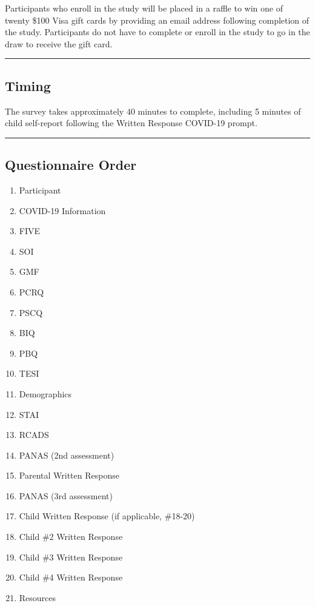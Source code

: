 \documentclass[]{book}
\providecommand{\tightlist}{%
  \setlength{\itemsep}{0pt}\setlength{\parskip}{0pt}}
\begin{document}
Participants who enroll in the study will be placed in a raffle to win one of twenty \$100 Visa gift cards by providing an email address following completion of the study. Participants do not have to complete or enroll in the study to go in the draw to receive the gift card.

\begin{center}\rule{0.5\linewidth}{0.5pt}\end{center}

\hypertarget{timing}{%
\subsection{Timing}\label{timing}}

The survey takes approximately 40 minutes to complete, including 5 minutes of child self-report following the Written Response COVID-19 prompt.

\begin{center}\rule{0.5\linewidth}{0.5pt}\end{center}

\hypertarget{questionnaire-order}{%
\subsection{Questionnaire Order}\label{questionnaire-order}}

\begin{enumerate}
\def\labelenumi{\arabic{enumi}.}
\tightlist
\item
  Participant
\item
  COVID-19 Information
\item
  FIVE
\item
  SOI
\item
  GMF
\item
  PCRQ
\item
  PSCQ
\item
  BIQ
\item
  PBQ
\item
  TESI
\item
  Demographics
\item
  STAI
\item
  RCADS
\item
  PANAS (2nd assessment)
\item
  Parental Written Response
\item
  PANAS (3rd assessment)
\item
  Child Written Response
  (if applicable, \#18-20)
\item
  Child \#2 Written Response
\item
  Child \#3 Written Response
\item
  Child \#4 Written Response
\item
  Resources
\end{enumerate}
\end{document}
